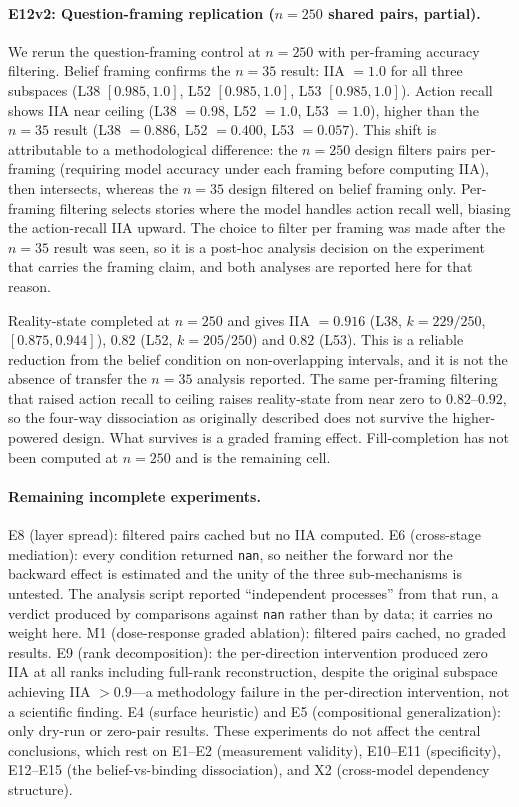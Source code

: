 \documentclass{article}
\begin{document}
\paragraph{E12v2: Question-framing replication ($n = 250$ shared pairs, partial).}
We rerun the question-framing control at $n = 250$ with per-framing accuracy filtering. Belief framing confirms the $n = 35$ result: IIA $= 1.0$ for all three subspaces (L38 $[0.985, 1.0]$, L52 $[0.985, 1.0]$, L53 $[0.985, 1.0]$). Action recall shows IIA near ceiling (L38 $= 0.98$, L52 $= 1.0$, L53 $= 1.0$), higher than the $n = 35$ result (L38 $= 0.886$, L52 $= 0.400$, L53 $= 0.057$). This shift is attributable to a methodological difference: the $n = 250$ design filters pairs per-framing (requiring model accuracy under each framing before computing IIA), then intersects, whereas the $n = 35$ design filtered on belief framing only. Per-framing filtering selects stories where the model handles action recall well, biasing the action-recall IIA upward. The choice to filter per framing was made after the $n = 35$ result was seen, so it is a post-hoc analysis decision on the experiment that carries the framing claim, and both analyses are reported here for that reason.

Reality-state completed at $n = 250$ and gives IIA $= 0.916$ (L38, $k = 229/250$, $[0.875, 0.944]$), $0.82$ (L52, $k = 205/250$) and $0.82$ (L53). This is a reliable reduction from the belief condition on non-overlapping intervals, and it is not the absence of transfer the $n = 35$ analysis reported. The same per-framing filtering that raised action recall to ceiling raises reality-state from near zero to $0.82$--$0.92$, so the four-way dissociation as originally described does not survive the higher-powered design. What survives is a graded framing effect. Fill-completion has not been computed at $n = 250$ and is the remaining cell.

\paragraph{Remaining incomplete experiments.}
E8 (layer spread): filtered pairs cached but no IIA computed. E6 (cross-stage mediation): every condition returned \texttt{nan}, so neither the forward nor the backward effect is estimated and the unity of the three sub-mechanisms is untested. The analysis script reported ``independent processes'' from that run, a verdict produced by comparisons against \texttt{nan} rather than by data; it carries no weight here. M1 (dose-response graded ablation): filtered pairs cached, no graded results. E9 (rank decomposition): the per-direction intervention produced zero IIA at all ranks including full-rank reconstruction, despite the original subspace achieving IIA $> 0.9$---a methodology failure in the per-direction intervention, not a scientific finding. E4 (surface heuristic) and E5 (compositional generalization): only dry-run or zero-pair results. These experiments do not affect the central conclusions, which rest on E1--E2 (measurement validity), E10--E11 (specificity), E12--E15 (the belief-vs-binding dissociation), and X2 (cross-model dependency structure).
\end{document}

